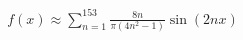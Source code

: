 \documentclass[preview]{standalone}
\begin{document}
\begin{align*}
f(x) \approx \sum_{n=1}^{153} \frac{8n}{\pi(4n^2-1)} \sin(2nx)
\end{align*}
\end{document}

